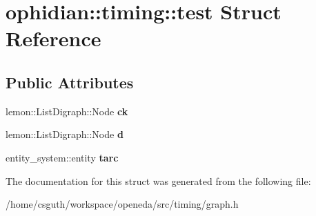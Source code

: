 \hypertarget{structophidian_1_1timing_1_1test}{\section{ophidian\-:\-:timing\-:\-:test Struct Reference}
\label{structophidian_1_1timing_1_1test}
}
\subsection*{Public Attributes}
\begin{DoxyCompactItemize}
\item 
\hypertarget{structophidian_1_1timing_1_1test_afe4e1fb0081480b9ded56d6aef39cf05}{lemon\-::\-List\-Digraph\-::\-Node {\bfseries ck}}\label{structophidian_1_1timing_1_1test_afe4e1fb0081480b9ded56d6aef39cf05}

\item 
\hypertarget{structophidian_1_1timing_1_1test_ac3f29d79152cb953145d5d208581a30e}{lemon\-::\-List\-Digraph\-::\-Node {\bfseries d}}\label{structophidian_1_1timing_1_1test_ac3f29d79152cb953145d5d208581a30e}

\item 
\hypertarget{structophidian_1_1timing_1_1test_a83cb5080d6121cc1f7f94b7aa5767842}{entity\-\_\-system\-::entity {\bfseries tarc}}\label{structophidian_1_1timing_1_1test_a83cb5080d6121cc1f7f94b7aa5767842}

\end{DoxyCompactItemize}


The documentation for this struct was generated from the following file\-:\begin{DoxyCompactItemize}
\item 
/home/csguth/workspace/openeda/src/timing/graph.\-h\end{DoxyCompactItemize}
